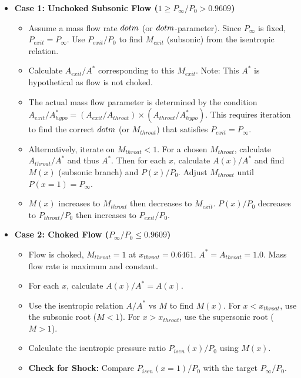 \begin{itemize}
\tightlist
\item
  \textbf{Case 1: Unchoked Subsonic Flow
  (\(1 \ge P_{\infty}/P_0 > 0.9609\))}

  \begin{itemize}
  \tightlist
  \item
    Assume a mass flow rate \(\\dot{m}\) (or \(\\dot{m}\)-parameter).
    Since \(P_{\infty}\) is fixed, \(P_{exit}=P_{\infty}\). Use
    \(P_{exit}/P_0\) to find \(M_{exit}\) (subsonic) from the isentropic
    relation.
  \item
    Calculate \(A_{exit}/A^*\) corresponding to this \(M_{exit}\). Note:
    This \(A^*\) is hypothetical as flow is not choked.
  \item
    The actual mass flow parameter is determined by the condition
    \(A_{exit}/A^*_{hypo} = (A_{exit}/A_{throat}) \times (A_{throat}/A^*_{hypo})\).
    This requires iteration to find the correct \(\\dot{m}\) (or
    \(M_{throat}\)) that satisfies \(P_{exit}=P_{\infty}\).
  \item
    Alternatively, iterate on \(M_{throat} < 1\). For a chosen
    \(M_{throat}\), calculate \(A_{throat}/A^*\) and thus \(A^*\). Then
    for each \(x\), calculate \(A(x)/A^*\) and find \(M(x)\) (subsonic
    branch) and \(P(x)/P_0\). Adjust \(M_{throat}\) until
    \(P(x=1) = P_{\infty}\).
  \item
    \(M(x)\) increases to \(M_{throat}\) then decreases to \(M_{exit}\).
    \(P(x)/P_0\) decreases to \(P_{throat}/P_0\) then increases to
    \(P_{exit}/P_0\).
  \end{itemize}
\item
  \textbf{Case 2: Choked Flow (\(P_{\infty}/P_0 \le 0.9609\))}

  \begin{itemize}
  \tightlist
  \item
    Flow is choked, \(M_{throat}=1\) at \(x_{throat}=0.6461\).
    \(A^* = A_{throat} = 1.0\). Mass flow rate is maximum and constant.
  \item
    For each \(x\), calculate \(A(x)/A^* = A(x)\).
  \item
    Use the isentropic relation \(A/A^*\) vs \(M\) to find \(M(x)\). For
    \(x < x_{throat}\), use the subsonic root (\(M<1\)). For
    \(x > x_{throat}\), use the supersonic root (\(M>1\)).
  \item
    Calculate the isentropic pressure ratio \(P_{isen}(x)/P_0\) using
    \(M(x)\).
  \item
    \textbf{Check for Shock:} Compare \(P_{isen}(x=1)/P_0\) with the
    target \(P_{\infty}/P_0\).


\end{itemize}
\end{itemize}
